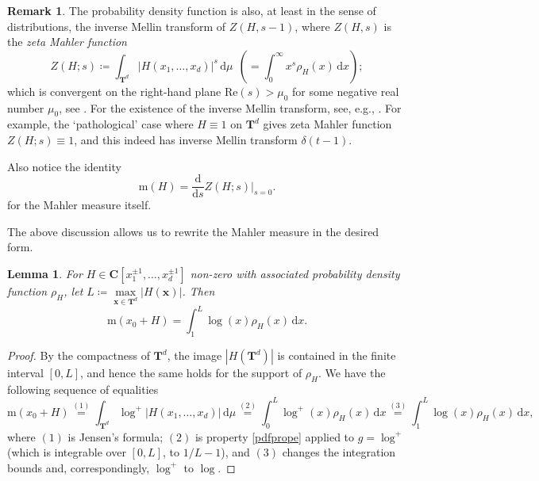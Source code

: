 \documentclass[12pt,reqno]{amsart}
\theoremstyle{definition}
\theoremstyle{plain}
\newtheorem{lemma}[theorem]{Lemma}
\theoremstyle{definition}
\newtheorem{remark}[theorem]{Remark}
\newcommand{\Cc}{\mathbf{C}}
\newcommand{\T}{\mathbf{T}}
\newcommand\m{\mathrm{m}}
\renewcommand{\Re}{\mathrm{Re}}
\renewcommand{\d}{\mathrm{d}}
\begin{document}
\begin{remark} \label{remzetaM}
The probability density function is also, at least in the sense of distributions, the inverse Mellin transform of $Z(H,s-1)$, where $Z(H,s)$ is the \emph{zeta Mahler function} 
 \[
 Z(H;s) \coloneqq  \int_{\T^d} |H(x_1,\dots,x_d)|^s \, \d\mu \ \ (=\int_0^\infty x^{s} \rho_{H}(x) \, \d x); 
 \]
  which is convergent on the right-hand plane $\Re (s) > \mu_0$ for some negative real number $\mu_0$, see \cite[Theorem 8]{Akatsuka}. 
For the existence of the inverse Mellin transform, see, e.g.,  \cite[11.1.2.3]{Mellinex}. For example, the `pathological' case where $H \equiv 1$ on $\T^d$ gives zeta Mahler function $Z(H;s) \equiv 1$, and this indeed has inverse Mellin transform $\delta(t-1)$. 

  Also notice the identity 
  \begin{equation}  \label{MMandMahlerZeta} 
  \m(H) = \frac{\d}{\d s} Z(H;s) |_{s=0}. 
  \end{equation} 
  for the Mahler measure itself. 
\end{remark} 

The above discussion allows us to rewrite the Mahler measure in the desired form. 
\begin{lemma} For $H \in \Cc[x_1^{\pm 1}, \ldots, x_{d}^{\pm 1}]$ non-zero with associated probability density function $\rho_H$, let $L \coloneqq  \max\limits_{\mathbf x \in \T^d} |H(\mathbf x)|$. Then  
\begin{equation}
\label{Jensen}
\m(x_0 + H) = \int_{1}^{L} \log(x) \rho_{H}(x) \, \d x.    
\end{equation}
\end{lemma} 

\begin{proof} 
By the compactness of $\T^d$, the image $|H(\T^d)|$ is contained in the finite interval $[0,L]$, and hence the same holds for the support of $\rho_H$. We have the following sequence of equalities
\begin{equation*}
\m(x_0 + H) \overset{(1)}{=}  \int_{\T^d} \log^+{|H(x_1, \ldots, x_d)|}\,  \d \mu \overset{(2)}{=} \int_{0}^{L} \log^+(x) \rho_{H}(x) \, \d x \overset{(3)}{=} \int_{1}^{L} \log(x) \rho_{H}(x) \, \d x, 
\end{equation*}
where $(1)$ is Jensen's formula; $(2)$ is property \eqref{pdfprope} applied to $g=\log^+$ (which is integrable over $[0,L]$, to $1/L-1$), and $(3)$ changes the integration bounds and, correspondingly, $\log^+$ to $\log$.  
\end{proof} 
\end{document}
